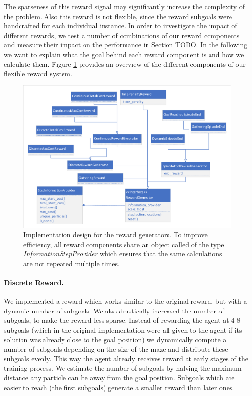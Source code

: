 The sparseness of this reward signal may significantly increase the complexity of the problem. Also this reward is not flexible, since the reward subgoals were handcrafted for each individual instance. In order to investigate the impact of different rewards, we test a number of combinations of our reward components and measure their impact on the performance in Section TODO. In the following we want to explain what the goal behind each reward component is and how we calculate them. Figure \ref{fig:RewardDesign} provides an overview of the different components of our flexible reward system.

\begin{figure}[ht]
    
    \begin{center}
        \includegraphics[clip, trim=10px 10px 10px 10px, width=0.95\columnwidth]{figures/implementation/reward_design.pdf}
    \end{center}
    
    \caption[Implementation Design for the Reward Generators]{Implementation design for the reward generators. To improve efficiency, all reward components share an object called of the type \textit{InformationStepProvider} which ensures that the same calculations are not repeated multiple times.}
    \label{fig:RewardDesign}
\end{figure}

\paragraph{Discrete Reward.}
We implemented a reward which works similar to the original reward, but with a dynamic number of subgoals. We also drastically increased the number of subgoals, to make the reward less sparse. Instead of rewarding the agent at 4-8 subgoals (which in the original implementation were all given to the agent if its solution was already close to the goal position) we dynamically compute a number of subgoals depending on the size of the maze and distribute these subgoals evenly. This way the agent already receives reward at early stages of the training process. We estimate the number of subgoals by halving the maximum distance any particle can be away from the goal position. Subgoals which are easier to reach (the first subgoals) generate a smaller reward than later ones.

